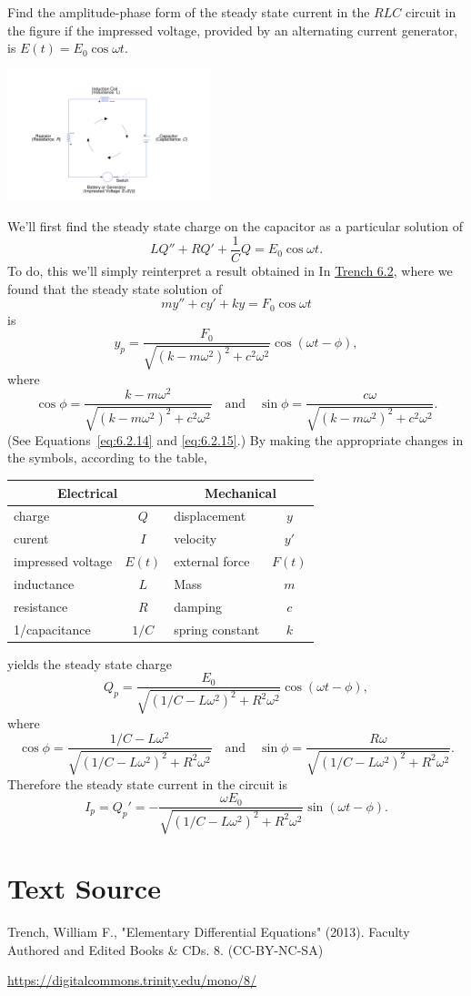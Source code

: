 \documentclass{ximera}
\begin{document}
\begin{example}\label{example:6.3.2}
Find the amplitude-phase form of the steady state current in the $RLC$
circuit in the figure if the impressed voltage, provided by
an alternating current generator, is $E(t)=E_0\cos\omega t$.

\begin{image}
  \includegraphics[height=1.5in]{fig060301.jpg} 
\end{image}

\begin{explanation}
We'll first find the steady state charge on the capacitor as
a particular solution of
$$
LQ''+RQ'+\frac{1}{C}Q=E_0\cos\omega t.
$$
To do, this we'll simply reinterpret a result obtained in
In \href{https://ximera.osu.edu/ode/main/springProblemsII/springProblemsII}{Trench 6.2}, where we found that the steady state solution of
$$
my''+cy'+ky=F_0\cos\omega t
$$
is
$$
y_p=\frac{F_0}{\sqrt{(k-m\omega^2)^2+c^2\omega^2}}
\cos(\omega t-\phi),
$$
where
$$
\cos\phi=\frac{k-m\omega^2}{\sqrt
{(k-m\omega^2)^2+c^2\omega^2}}\quad\mbox{and}\quad
\sin\phi=\frac{c\omega}{\sqrt{(k-m\omega^2)^2+c^2\omega^2}}.
$$
(See Equations~\eqref{eq:6.2.14} and \eqref{eq:6.2.15}.) By making the
appropriate changes in the symbols, according to the table,

\begin{center}
\begin{tabular}{|lc|lc|}\hline
\multicolumn{2}{|c|}{\bf Electrical}&
\multicolumn{2}{c|}{\bf Mechanical}\\\hline
charge& $Q$& displacement&$y$\\\hline
curent&$I$&velocity&$y'$\\\hline
impressed voltage&$E(t)$&external force&$F(t)$\\\hline
inductance&$L$&Mass&$m$\\\hline
resistance&$R$&damping&$c$\\\hline
1/capacitance&$1/C$&spring constant&$k$\\\hline
\end{tabular}
\end{center}

yields the steady state charge
$$
Q_p=\frac{E_0}{\sqrt{(1/C-L\omega^2)^2+R^2\omega^2}}\cos(\omega
t-\phi),
$$
where
$$
\cos\phi=\frac{1/C-L\omega^2}{\sqrt{(1/C-L\omega^2)^2+R^2\omega^2}}
\quad\mbox{and}\quad
\sin\phi=\frac{R\omega}{\sqrt{(1/C-L\omega^2)^2+R^2\omega^2}}.
$$
 Therefore the steady state current in the circuit
is
$$
I_p=Q_p'=
-\frac{\omega E_0}{\sqrt{(1/C-L\omega^2)^2+R^2\omega^2}}\sin(\omega
t-\phi).
$$
\end{explanation}
\end{example}
\section*{Text Source}
Trench, William F., "Elementary Differential Equations" (2013). Faculty Authored and Edited Books \& CDs. 8. (CC-BY-NC-SA)

\href{https://digitalcommons.trinity.edu/mono/8/}{https://digitalcommons.trinity.edu/mono/8/}
\end{document}
